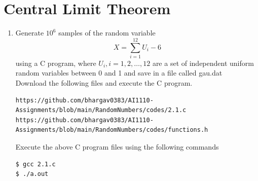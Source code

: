 \documentclass[journal,12pt,twocolumn]{IEEEtran}
\renewcommand\thesection{\arabic{section}}
\begin{document}
\section{Central Limit Theorem}
%
\begin{enumerate}[label=\thesection.\arabic*
,ref=\thesection.\theenumi]
%
\item
Generate $10^6$ samples of the random variable
%
\begin{equation}
X = \sum_{i=1}^{12}U_i -6
\end{equation}
%
using a C program, where $U_i, i = 1,2,\dots, 12$ are  a set of independent uniform random variables between 0 and 1 and save in a file called gau.dat\\
\solution Download the following files and execute the  C program.
\begin{lstlisting}
https://github.com/bhargav0383/AI1110-Assignments/blob/main/RandomNumbers/codes/2.1.c
https://github.com/bhargav0383/AI1110-Assignments/blob/main/RandomNumbers/codes/functions.h
\end{lstlisting}
Execute the above C program files using the following commands
\begin{lstlisting}
$ gcc 2.1.c
$ ./a.out
\end{lstlisting}


\end{enumerate}
\end{document}
